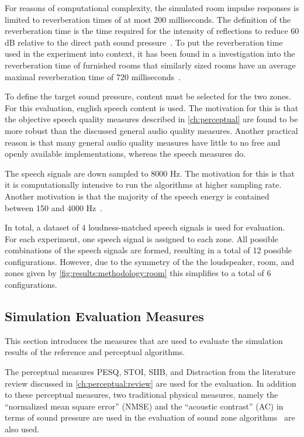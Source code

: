 For reasons of computational complexity, the simulated room impulse 
responses is limited to reverberation times of at most 200 milliseconds.
The definition of the reverberation time is the time required for the intensity of reflections to reduce 60 dB relative 
to the direct path sound pressure~\cite{habets2006room}. 
To put the reverberation time used in the experiment into context, 
it has been found in a investigation into the reverberation time of furnished rooms
that similarly sized rooms have an average maximal reverberation 
time of 720 milliseconds~\cite{diaz2005reverberation}.

To define the target sound pressure, content must be selected for the two zones.
For this evaluation, english speech content is used.
The motivation for this is that the objective speech quality measures described in 
\autoref{ch:perceptual} are found to be more robust than
the discussed general audio quality measures.
Another practical reason is that many general audio quality measures have 
little to no free and openly available implementations, whereas the speech measures do.

The speech signals are down sampled to 8000 Hz.
The motivation for this is that it is computationally intensive to run the algorithms at higher sampling rate.
Another motivation is that the majority of the speech energy is contained between 150 and 4000 Hz~\cite{etsi2010}.

In total, a dataset of 4 loudness-matched speech signals is used for evaluation.
For each experiment, one speech signal is assigned to each zone.
All possible combinations of the speech signals are formed, resulting in a total of 12 possible configurations.
However, due to the symmetry of the the loudspeaker, room, and zones given by \autoref{fig:results:methodology:room} this simplifies to 
a total of 6 configurations.

\subsection{Simulation Evaluation Measures}
\label{ch:results:methodology:measures}
This section introduces the measures that are used to evaluate the simulation results 
of the reference and perceptual algorithms.

The perceptual measures PESQ, STOI, SIIB, and Distraction 
from the literature review discussed in \autoref{ch:perceptual:review} are used for the evaluation.
In addition to these perceptual measures, two traditional physical measures, namely the ``normalized mean square error'' (NMSE) and
the ``acoustic contrast'' (AC) in terms of sound pressure are used in the evaluation of 
sound zone algorithms~\cite{lee2018unified} are also used.

